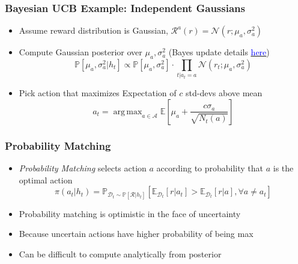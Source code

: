 \documentclass[handout]{beamer}
\DeclareMathOperator*{\argmax}{arg\,max}
\begin{document}
\begin{frame}
\frametitle{Bayesian UCB Example: Independent Gaussians}
\pause
\begin{itemize}[<+->]
\item Assume reward distribution is Gaussian, $\mathcal{R}^a(r) =\mathcal{N}(r;\mu_a, \sigma_a^2)$
\item Compute Gaussian posterior over $\mu_a,\sigma_a^2$  (Bayes update details \href{https://people.eecs.berkeley.edu/~jordan/courses/260-spring10/lectures/lecture5.pdf}{\underline{\textcolor{blue}{here}}})
$$\mathbb{P}[\mu_a, \sigma_a^2|h_t] \propto \mathbb{P}[\mu_a, \sigma_a^2] \cdot \prod_{t|a_t=a} \mathcal{N}(r_t;\mu_a, \sigma_a^2)$$
\item Pick action that maximizes Expectation of $c$ std-devs above mean
$$a_t = \argmax_{a\in\mathcal{A}} \mathbb{E}[\mu_a + \frac {c \sigma_a} {\sqrt{N_t(a)}}]$$
\end{itemize}
\end{frame}


\begin{frame}
\frametitle{Probability Matching}
\pause
\begin{itemize}[<+->]
\item {\em Probability Matching} selects action $a$ according to probability that $a$ is the optimal action
$$\pi(a_t|h_t) = \mathbb{P}_{\mathcal{D}_t\sim \mathbb{P}[\mathcal{R}|h_t]}[\mathbb{E}_{\mathcal{D}_t}[r|a_t] > \mathbb{E}_{\mathcal{D}_t}[r|a], \forall a \neq a_t]$$
\item Probability matching is optimistic in the face of uncertainty
\item Because uncertain actions have higher probability of being max
\item Can be difficult to compute analytically from posterior
\end{itemize}
\end{frame}
\end{document}
